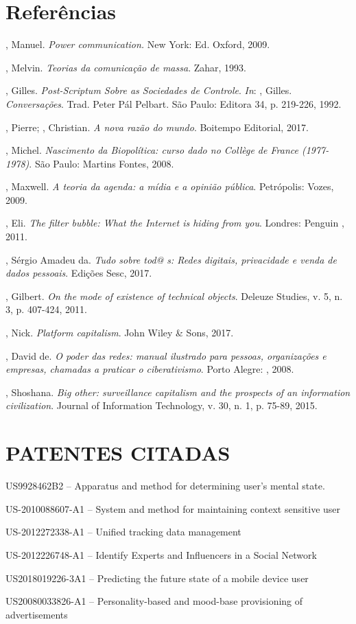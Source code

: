\section{Referências}

\begin{Parskip}
, Manuel. \emph{Power communication.} New York: Ed. Oxford,
2009.

, Melvin. \emph{Teorias da comunicação de massa}. Zahar, 1993.

, Gilles. \emph{Post-Scriptum Sobre as Sociedades de Controle}. \emph{In}:
, Gilles. \emph{Conversações}. Trad. Peter Pál Pelbart. São Paulo:
Editora 34, p. 219-226, 1992.

, Pierre; , Christian. \emph{A nova razão do mundo}.
Boitempo Editorial, 2017.

, Michel. \emph{Nascimento da Biopolítica: curso dado no
Collège de France (1977-1978)}. São Paulo: Martins Fontes, 2008.

, Maxwell. \emph{A teoria da agenda: a mídia e a opinião
pública}. Petrópolis: Vozes, 2009.

, Eli. \emph{The filter bubble: What the Internet is hiding
from you}. Londres: Penguin , 2011.

, Sérgio Amadeu da. \emph{Tudo sobre tod@ s: Redes digitais,
privacidade e venda de dados pessoais}. Edições Sesc, 2017.

, Gilbert. \emph{On the mode of existence of technical
objects}. Deleuze Studies, v. 5, n. 3, p. 407-424, 2011.

, Nick. \emph{Platform capitalism}. John Wiley \& Sons, 2017.

, David de. \emph{O poder das redes: manual ilustrado para
pessoas, organizações e empresas, chamadas a praticar o ciberativismo}.
Porto Alegre: , 2008.

, Shoshana. \emph{Big other: surveillance capitalism and the
prospects of an information civilization}. Journal of Information
Technology, v. 30, n. 1, p. 75-89, 2015.\\
\end{Parskip}

\section{PATENTES CITADAS}

\begin{Parskip}
US9928462B2 -- Apparatus and method for determining user's mental state.

US-2010088607-A1 -- System and method for maintaining context sensitive
user

US-2012272338-A1 -- Unified tracking data management

US-2012226748-A1 -- Identify Experts and Influencers in a Social Network

US2018019226-3A1 -- Predicting the future state of a mobile device user

US20080033826-A1 -- Personality-based and mood-base provisioning of
advertisements
\end{Parskip}